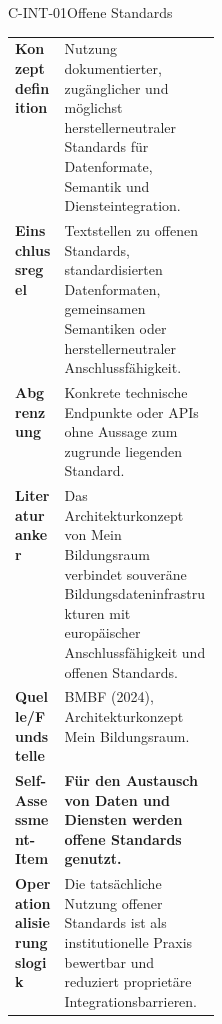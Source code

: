 \documentclass[10pt,a4paper]{article}
\begin{document}
\begin{codecard}{C-INT-01}{Offene Standards}
\begin{tabularx}{\linewidth}{@{}>{\RaggedRight\arraybackslash\bfseries\color{DeepNavy}}p{0.245\linewidth}>{\RaggedRight\arraybackslash}X@{}}
Konzeptdefinition & Nutzung dokumentierter, zugänglicher und möglichst herstellerneutraler Standards für Datenformate, Semantik und Diensteintegration. \\
\arrayrulecolor{SoftRule}\hline
Einschlussregel & Textstellen zu offenen Standards, standardisierten Datenformaten, gemeinsamen Semantiken oder herstellerneutraler Anschlussfähigkeit. \\
\arrayrulecolor{SoftRule}\hline
Abgrenzung & Konkrete technische Endpunkte oder APIs ohne Aussage zum zugrunde liegenden Standard. \\
\arrayrulecolor{SoftRule}\hline
Literaturanker & Das Architekturkonzept von Mein Bildungsraum verbindet souveräne Bildungsdateninfrastrukturen mit europäischer Anschlussfähigkeit und offenen Standards. \\
\arrayrulecolor{SoftRule}\hline
Quelle/Fundstelle & BMBF (2024), Architekturkonzept Mein Bildungsraum. \\
\arrayrulecolor{SoftRule}\hline
Self-Assessment-Item & \textbf{Für den Austausch von Daten und Diensten werden offene Standards genutzt.} \\
\arrayrulecolor{SoftRule}\hline
Operationalisierungslogik & Die tatsächliche Nutzung offener Standards ist als institutionelle Praxis bewertbar und reduziert proprietäre Integrationsbarrieren. \\
\end{tabularx}
\end{codecard}
\end{document}
